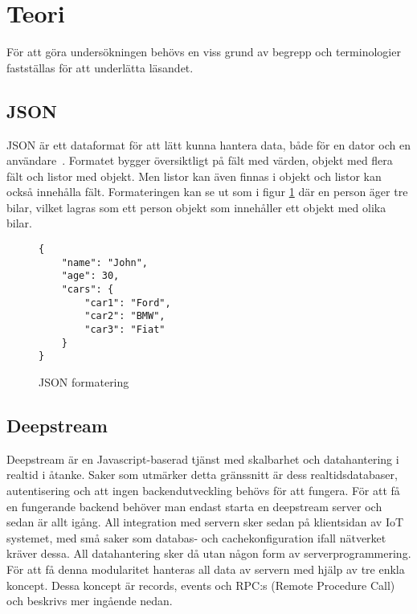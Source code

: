 \section{Teori}

\label{sec:tim-theory}
För att göra undersökningen behövs en viss grund av begrepp och terminologier fastställas för att underlätta läsandet.

\subsection{JSON}
JSON är ett dataformat för att lätt kunna hantera data, både för en dator och en användare~\cite{json}. Formatet bygger översiktligt på fält med värden, objekt med flera fält och listor med objekt. Men listor kan även finnas i objekt och listor kan också innehålla fält. Formateringen kan se ut som i figur \ref{fig:tim-jsonformat} där en person äger tre bilar, vilket lagras som ett person objekt som innehåller ett objekt med olika bilar.

\lstset{language=Java}
\begin{figure}[h]
  \center
  \begin{minipage}[c]{5cm}
    \begin{lstlisting}
{
    "name": "John",
    "age": 30,
    "cars": {
        "car1": "Ford",
        "car2": "BMW",
        "car3": "Fiat"
    }
} 
    \end{lstlisting}
  \caption{JSON formatering}
  \label{fig:tim-jsonformat}
  \end{minipage}
\end{figure}

\subsection{Deepstream}
\label{subsec:tim-deepstream}
Deepstream är en Javascript-baserad tjänst med skalbarhet och datahantering i realtid i åtanke. Saker som utmärker detta gränssnitt är dess realtidsdatabaser, autentisering och att ingen backendutveckling behövs för att fungera. För att få en fungerande backend behöver man endast starta en deepstream server och sedan är allt igång. All integration med servern sker sedan på klientsidan av IoT systemet, med små saker som databas- och cachekonfiguration ifall nätverket kräver dessa. All datahantering sker då utan någon form av serverprogrammering. För att få denna modularitet hanteras all data av servern med hjälp av tre enkla koncept. Dessa koncept är records, events och RPC:s (Remote Procedure Call) och beskrivs mer ingående nedan. 

